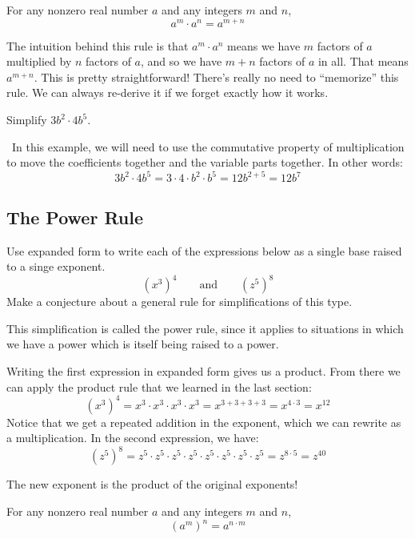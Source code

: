 \begin{boxeddef}
For any nonzero real number $a$ and any integers $m$ and $n$, \[a^m \cdot a^n = a^{m+n}\]
\end{boxeddef}

The intuition behind this rule is that $a^m \cdot a^n$ means we have $m$ factors of $a$ multiplied by $n$ factors of $a$, and so we have $m+n$ factors of $a$ in all. That means $a^{m+n}$. This is pretty straightforward! There's really no need to ``memorize'' this rule. We can always re-derive it if we forget exactly how it works.

\begin{boxedex}
Simplify $3b^2 \cdot 4b^5.$

\exsoln\ In this example, we will need to use the commutative property of multiplication to move the coefficients together and the variable parts together. In other words: \[3b^2 \cdot 4b^5 = 3\cdot4\cdot b^2 \cdot b^5 = 12b^{2+5} = 12b^7\]
\end{boxedex}


\subsection{The Power Rule}

\begin{boxedexplore}
Use expanded form to write each of the expressions below as a single base raised to a singe exponent.
\[(x^3)^4 \qquad\text{and}\qquad (z^5)^8\]
Make a conjecture about a general rule for simplifications of this type.
\end{boxedexplore}

This simplification is called the power rule, since it applies to situations in which we have a power which is itself being raised to a power.

Writing the first expression in expanded form gives us a product. From there we can apply the product rule that we learned in the last section:
\[(x^3)^4 = x^3 \cdot x^3 \cdot x^3 \cdot x^3 = x^{3+3+3+3} = x^{4\cdot3} = x^{12}\]
Notice that we get a repeated addition in the exponent, which we can rewrite as a multiplication. In the second expression, we have:
\[(z^5)^8 = z^5 \cdot z^5 \cdot z^5 \cdot z^5 \cdot z^5 \cdot z^5 \cdot z^5 \cdot z^5 = z^{8\cdot5} = z^{40}\]

The new exponent is the product of the original exponents!

\begin{boxeddef}
For any nonzero real number $a$ and any integers $m$ and $n$, \[(a^m)^n = a^{n \cdot m}\]
\end{boxeddef}

